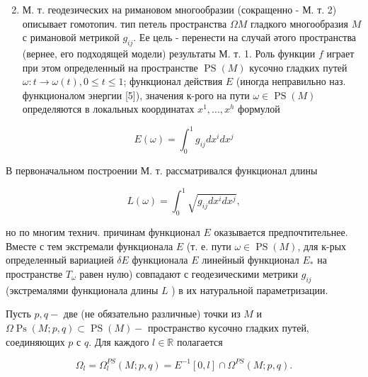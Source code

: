 \documentclass[10pt]{article}
\begin{document}
\begin{enumerate}

  \setcounter{enumi}{1}

  \item М. т. геодезических на римановом многообразии (сокращенно - М. т. 2) описывает гомотопич. тип петель пространства $\Omega M$ гладкого многообразия $M$ с римановой метрикой $g_{i j}$. Ее цель - перенести на случай әтого пространства (вернее, его подходящей модели) результаты М. т. 1. Роль функции $f$ играет при этом определенный на пространстве $\operatorname{PS}(M)$ кусочно гладких путей $\omega: t \rightarrow \omega(t), 0 \leqslant t \leqslant 1$; функционал действия $E$ (иногда неправильно наз. функционалом энергии [5]), значения к-рого на пути $\omega \in \operatorname{PS}(M)$ определяются в локальных координатах $x^{1}, \ldots, x^{h}$ формулой

\end{enumerate}



\[

E(\omega)=\int_{0}^{1} g_{i j} d x^{i} d x^{j}

\]



В первоначальном построении М. т. рассматривался функционал длины



\[

L(\omega)=\int_{0}^{1} \sqrt{g_{i j} d x^{i} d x^{j}},

\]



но по многим технич. причинам функционал $E$ оказывается предпочтительнее. Вместе с тем экстремали функционала $E$ (т. е. пути $\omega \in \operatorname{PS}(M)$, для к-рых определенный вариацией $\delta E$ функционала $E$ линейный функционал $E_{*}$ на пространстве $T_{\omega}$ равен нулю) совпадают с геодезическими метрики $g_{i j}$ (экстремалями функционала длины $L$ ) в их натуральной параметризации.



Пусть $p, q-$ две (не обязательно различные) точки из $M$ и $\Omega \operatorname{Ps}(M ; p, q) \subset \operatorname{PS}(M)-$ пространство кусочно гладких путей, соединяющих $p$ с $q$. Для каждого $l \in \mathbb{R}$ полагается



\[

\Omega_{l}=\Omega_{l}^{P S}(M ; p, q)=E^{-1}[0, l] \cap \Omega^{P S}(M ; p, q) .

\]
\end{document}
